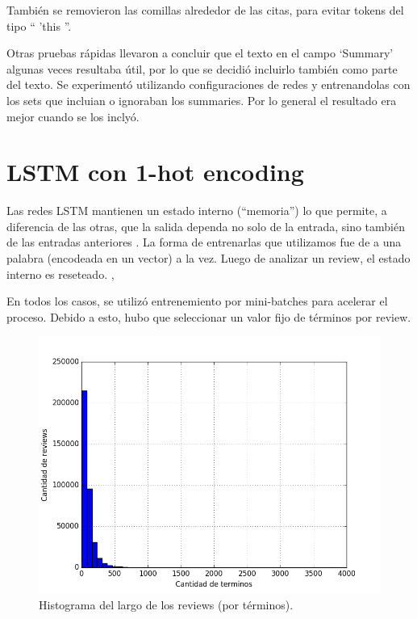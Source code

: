 Tambi\'en se removieron las comillas alrededor de las citas, para evitar tokens del tipo `` 'this ''.

Otras pruebas r\'apidas llevaron a concluir que el texto en el campo `Summary' algunas veces
resultaba \'util, por lo que se decidi\'o incluirlo tambi\'en como parte del texto. Se experiment\'o
utilizando configuraciones de redes y entrenandolas con los sets que incluian o ignoraban los
summaries. Por lo general el resultado era mejor cuando se los incly\'o.


\section{LSTM con 1-hot encoding}

Las redes LSTM mantienen un estado interno (``memoria'') lo que permite, a diferencia de las otras,
que la salida dependa no solo de la entrada, sino tambi\'en de las entradas anteriores
\cite{understanding_LSTM}. La forma de entrenarlas que utilizamos fue de a una palabra (encodeada
en un vector) a la vez.
Luego de analizar un review, el estado interno es reseteado. \cite{LSTM_time_series_predictions},
\cite{stateful_LSTM}

En todos los casos, se utiliz\'o entrenemiento por mini-batches para acelerar el proceso. Debido a
esto, hubo que seleccionar un valor fijo de t\'erminos por review.

\begin{figure}[h]
    \centering
    \includegraphics[width=1\linewidth]{Figures/terminos_por_review.png}
    \decoRule
    \caption[Terminos por review]{Histograma del largo de los reviews (por t\'erminos).}
    \label{fig:Histograma del largo de los reviews (por t\'erminos)}
\end{figure}

